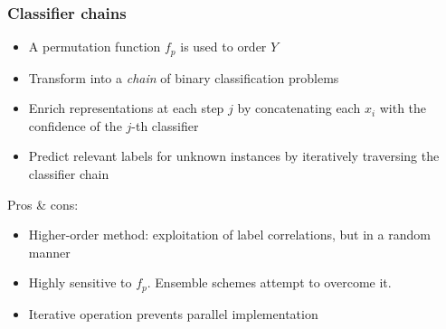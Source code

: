 \documentclass{beamer}
\begin{document}
\begin{frame}
\frametitle{Classifier chains}
\begin{itemize}
\item A permutation function $f_p$ is used to order $Y$
\item Transform into a \emph{chain} of binary classification problems
\item Enrich representations at each step $j$ by concatenating each $x_i$ with the confidence of the $j$-th classifier
\item Predict relevant labels for unknown instances by iteratively traversing the classifier chain
\end{itemize}

Pros \& cons:
\begin{itemize}
\item Higher-order method: exploitation of label correlations, but in a random manner
\item Highly sensitive to $f_p$. Ensemble schemes attempt to overcome it.
\item Iterative operation prevents parallel implementation
\end{itemize}
\end{frame}
\end{document}

